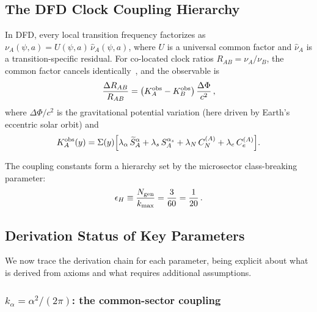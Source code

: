 \documentclass[twocolumn,showpacs,preprintnumbers,amsmath,amssymb,prd]{revtex4-2}
\newcommand{\kalpha}{k_\alpha}
\begin{document}
\subsection{The DFD Clock Coupling Hierarchy}\label{sec:hierarchy}

In DFD, every local transition frequency factorizes as
$\nu_A(\psi, a) = U(\psi, a)\,\hat{\nu}_A(\psi, a)$, where $U$
is a universal common factor and $\hat{\nu}_A$ is a
transition-specific residual.  For co-located clock ratios
$R_{AB} = \nu_A/\nu_B$, the common factor cancels
identically~\cite[Theorem~9.1]{Alcock2025_DFD_v32}, and the
observable is
\begin{equation}\label{eq:ratio-obs}
\frac{\Delta R_{AB}}{R_{AB}}
= \bigl(K_A^{\rm obs} - K_B^{\rm obs}\bigr)\,
  \frac{\Delta\Phi}{c^2}\,,
\end{equation}
where $\Delta\Phi/c^2$ is the gravitational potential variation
(here driven by Earth's eccentric solar orbit) and
\begin{equation}\label{eq:Kobs}
K_A^{\rm obs}(y) = \Sigma(y)\Bigl[
  \lambda_\alpha\,\widetilde{S}_A^\alpha
  + \lambda_s\,S_A^{\alpha_s}
  + \lambda_N\,C_N^{(A)}
  + \lambda_e\,C_e^{(A)}
\Bigr].
\end{equation}

The coupling constants form a hierarchy set by the microsector
class-breaking parameter:
\begin{equation}\label{eq:epsilon-H}
\epsilon_H \equiv \frac{N_{\rm gen}}{k_{\rm max}}
= \frac{3}{60} = \frac{1}{20}\,.
\end{equation}

\subsection{Derivation Status of Key Parameters}\label{sec:derivations}

We now trace the derivation chain for each parameter, being
explicit about what is derived from axioms and what requires
additional assumptions.

\subsubsection{$\kalpha = \alpha^2/(2\pi)$: the common-sector
coupling}\label{sec:kalpha-deriv}
\end{document}
